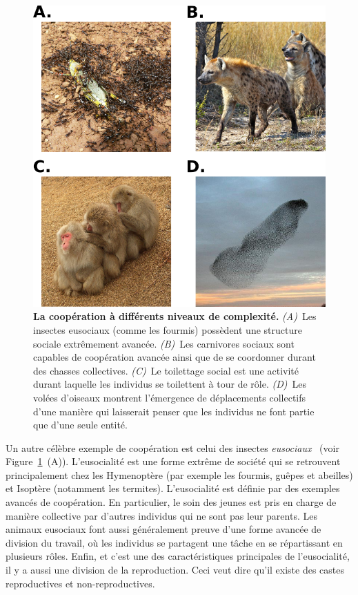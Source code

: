 	  \begin{figure}[hbt]
	      \begin{center}
	        \includegraphics[scale = 0.5]{fig/Intro/CooperationExamples.png}
	        \caption{\textbf{La coopération à différents niveaux de complexité.} {\em (A)}~Les insectes eusociaux (comme les fourmis) possèdent une structure sociale extrêmement avancée. {\em (B)}~Les carnivores sociaux sont capables de coopération avancée ainsi que de se coordonner durant des chasses collectives. {\em (C)}~Le toilettage social est une activité durant laquelle les individus se toilettent à tour de rôle. {\em (D)}~Les volées d'oiseaux montrent l'émergence de déplacements collectifs d'une manière qui laisserait penser que les individus ne font partie que d'une seule entité.} 
	        \label{fig:CooperationExamples}
	      \end{center}
	  \end{figure}

		Un autre célèbre exemple de coopération est celui des insectes \emph{eusociaux}~\parencite{Wilson1990} (voir Figure~\ref{fig:CooperationExamples}~(A)). L'eusocialité est une forme extrême de société qui se retrouvent principalement chez les Hymenoptère (par exemple les fourmis, guêpes et abeilles) et Isoptère (notamment les termites). L'eusocialité est définie par des exemples avancés de coopération. En particulier, le soin des jeunes est pris en charge de manière collective par d'autres individus qui ne sont pas leur parents. Les animaux eusociaux font aussi généralement preuve d'une forme avancée de division du travail, où les individus se partagent une tâche en se répartissant en plusieurs rôles. Enfin, et c'est une des caractéristiques principales de l'eusocialité, il y a aussi une division de la reproduction. Ceci veut dire qu'il existe des castes reproductives et non-reproductives.

